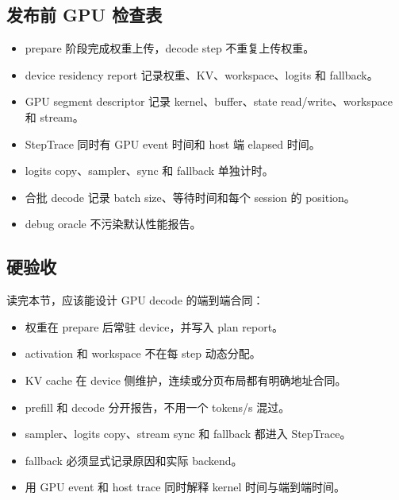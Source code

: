 \subsection{发布前 GPU 检查表}

\begin{rubricbox}
\begin{itemize}
  \item prepare 阶段完成权重上传，decode step 不重复上传权重。
  \item device residency report 记录权重、KV、workspace、logits 和 fallback。
  \item GPU segment descriptor 记录 kernel、buffer、state read/write、workspace 和 stream。
  \item StepTrace 同时有 GPU event 时间和 host 端 elapsed 时间。
  \item logits copy、sampler、sync 和 fallback 单独计时。
  \item 合批 decode 记录 batch size、等待时间和每个 session 的 position。
  \item debug oracle 不污染默认性能报告。
\end{itemize}
\end{rubricbox}

\subsection{硬验收}

读完本节，应该能设计 GPU decode 的端到端合同：

\begin{itemize}
  \item 权重在 prepare 后常驻 device，并写入 plan report。
  \item activation 和 workspace 不在每 step 动态分配。
  \item KV cache 在 device 侧维护，连续或分页布局都有明确地址合同。
  \item prefill 和 decode 分开报告，不用一个 tokens/s 混过。
  \item sampler、logits copy、stream sync 和 fallback 都进入 StepTrace。
  \item fallback 必须显式记录原因和实际 backend。
  \item 用 GPU event 和 host trace 同时解释 kernel 时间与端到端时间。
\end{itemize}
